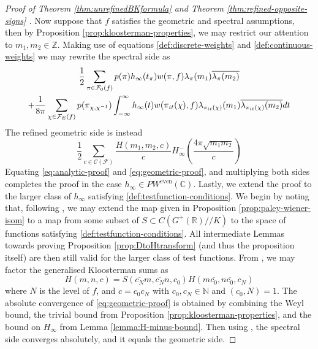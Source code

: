 \documentclass{article}
\numberwithin{equation}{section}
\begin{document}
\begin{proof}[Proof of Theorem \ref{thm:unrefinedBKformula} and Theorem \ref{thm:refined-opposite-signs} ]
Now suppose that $f$ satisfies the geometric and spectral assumptions, then by Proposition \ref{prop:kloosterman-properties}, we may restrict our attention to $m_1,m_2 \in \mathbb{Z}$. Making use of equations \eqref{def:discrete-weights} and \eqref{def:continuous-weights} we may rewrite the spectral side as
\begin{gather}
    \frac{1}{2}\sum_{\pi \in \mathcal{F}_0(f)}p(\pi)h_\infty(t_\pi)w(\pi,f)\lambda_{\pi}(m_1)\overline{\lambda_\pi(m_2)} \notag \\
    + \frac{1}{8\pi}\sum_{\chi \in \mathcal{F}_E(f)}p(\pi_{\chi,\chi^{-1}})\int_{-\infty}^{\infty}h_\infty(t)w(\pi_{it}(\chi),f)\lambda_{\pi_{it}(\chi)}(m_1)\overline{\lambda_{\pi_{it}(\chi)}(m_2)}dt \label{eq:analytic-proof}
\end{gather}
    The refined geometric side is instead
    \begin{equation}\label{eq:geometric-proof}
        \frac{1}{2}\sum_{c \in \mathcal{C}(\mathcal{F})}\frac{H(m_1,m_2,c)}{c}H_\infty^{-}\left(\frac{4\pi\sqrt{m_1m_2}}{c} \right)
    \end{equation}
    Equating \eqref{eq:analytic-proof} and \eqref{eq:geometric-proof}, and multiplying both sides completes the proof in the case $h_\infty \in PW^{\operatorname{even}}(\mathbb{C})$. 
    Lastly, we extend the proof to the larger class of $h_\infty$ satisfying \eqref{def:testfunction-conditions}. We begin by noting that, following \cite[Proposition 8.19]{KL-kuznetsov}, we may extend the map given in Proposition \ref{prop:paley-wiener-isom} to a map from some subset of $S\subset C(G^+(\mathbb{R})//K)$ to the space of functions satisfying \eqref{def:testfunction-conditions}. All intermediate Lemmas towards proving Proposition \ref{prop:DtoHtransform} (and thus the proposition itself) are then still valid for the larger class of test functions.
    From \cite[Theorem 3.8 (3)]{generalised}, we may factor the generalised Kloosterman sums as
    \begin{equation}\label{eq:kloosterman-factorisation}
        H(m,n,c)=S(\overline{c_N}m,\overline{c_N}n,c_0)H(m\overline{c_0},n\overline{c_0},c_N)
    \end{equation}
    where $N$ is the level of $f$, and $c=c_0c_N$ with $c_0,c_N \in \mathbb{N}$ and $(c_0,N)=1$. The absolute convergence of \eqref{eq:geometric-proof} is obtained by combining the Weyl bound, the trivial bound from Proposition \ref{prop:kloosterman-properties}, and the bound on $H_\infty$ from Lemma \ref{lemma:H-minus-bound}.
    Then using \cite[Propositions 8.24 and 8.25]{KL-kuznetsov}, the spectral side converges absolutely, and it equals the geometric side.
\end{proof} 
\end{document}
